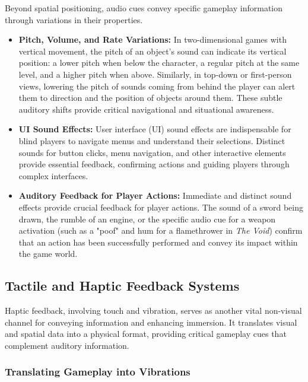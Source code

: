 Beyond spatial positioning, audio cues convey specific gameplay information through variations in their properties.
\begin{itemize}
    \item \textbf{Pitch, Volume, and Rate Variations:} In two-dimensional games with vertical movement, the pitch of an object's sound can indicate its vertical position: a lower pitch when below the character, a regular pitch at the same level, and a higher pitch when above\supercite{AFBIntroVG}. Similarly, in top-down or first-person views, lowering the pitch of sounds coming from behind the player can alert them to direction and the position of objects around them\supercite{AFBIntroVG}. These subtle auditory shifts provide critical navigational and situational awareness.
    \item \textbf{UI Sound Effects:} User interface (UI) sound effects are indispensable for blind players to navigate menus and understand their selections. Distinct sounds for button clicks, menu navigation, and other interactive elements provide essential feedback, confirming actions and guiding players through complex interfaces\supercite{NumberAnalytics2025}.
    \item \textbf{Auditory Feedback for Player Actions:} Immediate and distinct sound effects provide crucial feedback for player actions. The sound of a sword being drawn, the rumble of an engine, or the specific audio cue for a weapon activation (such as a "poof" and hum for a flamethrower in \textit{The Void}) confirm that an action has been successfully performed and convey its impact within the game world\supercite{NumberAnalytics2025}.
\end{itemize}

\subsection{Tactile and Haptic Feedback Systems}

Haptic feedback, involving touch and vibration, serves as another vital non-visual channel for conveying information and enhancing immersion. It translates visual and spatial data into a physical format, providing critical gameplay cues that complement auditory information\supercite{LighthouseGuild2025}.

\subsubsection{Translating Gameplay into Vibrations}

